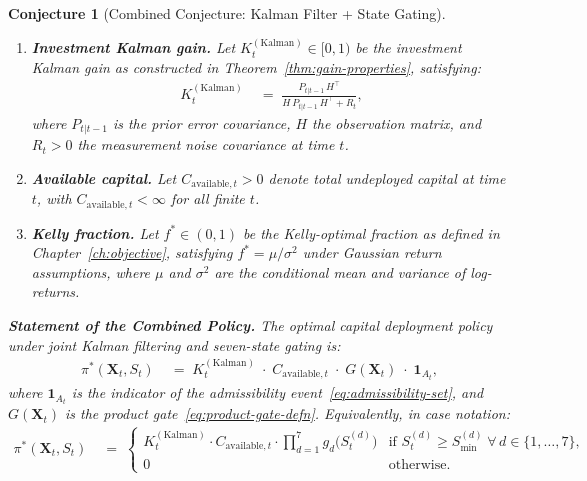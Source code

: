 \documentclass[12pt,openany]{book}
\numberwithin{equation}{chapter}
\theoremstyle{plain}
\newtheorem{conjecture}[theorem]{Conjecture}
\theoremstyle{definition}
\theoremstyle{remark}
\def\mathcal#1{#1}%
\begin{document}
\begin{conjecture}[Combined Conjecture: Kalman Filter + State Gating]
\begin{enumerate}
  \item \textbf{Investment Kalman gain.}
        Let $K_t^{(\mathrm{Kalman})} \in [0,1)$ be the
        investment Kalman gain as constructed in
        Theorem~\ref{thm:gain-properties}, satisfying:
        \begin{align}
          K_t^{(\mathrm{Kalman})}
          &\;=\;
          \frac{P_{t|t-1}\,H^\top}
               {H\,P_{t|t-1}\,H^\top + R_t},
          \label{eq:kalman-gain-recall}
        \end{align}
        where $P_{t|t-1}$ is the prior error covariance,
        $H$ the observation matrix, and $R_t > 0$ the
        measurement noise covariance at time $t$.

  \item \textbf{Available capital.}
        Let $C_{\mathrm{available},t} > 0$ denote total
        undeployed capital at time $t$, with
        $C_{\mathrm{available},t} < \infty$ for all finite $t$.

  \item \textbf{Kelly fraction.}
        Let $f^* \in (0,1)$ be the Kelly-optimal fraction
        as defined in Chapter~\ref{ch:objective}, satisfying
        $f^* = \mu / \sigma^2$ under Gaussian return
        assumptions, where $\mu$ and $\sigma^2$ are the
        conditional mean and variance of log-returns.
\end{enumerate}

\medskip
\noindent\textbf{Statement of the Combined Policy.}
The optimal capital deployment policy under joint
Kalman filtering and seven-state gating is:
\begin{align}
  \pi^*(\mathbf{X}_t, S_t)
  &\;=\;
  K_t^{(\mathrm{Kalman})}\;\cdot\; C_{\mathrm{available},t}
  \;\cdot\; G(\mathbf{X}_t)
  \;\cdot\; \mathbf{1}_{\mathcal{A}_t},
  \label{eq:combined-policy}
\end{align}
where $\mathbf{1}_{\mathcal{A}_t}$ is the indicator of the
admissibility event~\eqref{eq:admissibility-set}, and
$G(\mathbf{X}_t)$ is the product gate~\eqref{eq:product-gate-defn}.
Equivalently, in case notation:
\begin{align}
  \pi^*(\mathbf{X}_t, S_t)
  &\;=\;
  \begin{cases}
    K_t^{(\mathrm{Kalman})}
    \cdot C_{\mathrm{available},t}
    \cdot \displaystyle\prod_{d=1}^{7} g_d\!\bigl(\mathcal{S}_t^{(d)}\bigr)
    & \text{if } \mathcal{S}_t^{(d)} \geq \mathcal{S}_{\min}^{(d)}
      \;\forall\, d \in \{1,\ldots,7\}, \\[8pt]
    0
    & \text{otherwise}.
  \end{cases}
  \label{eq:combined-policy-cases}
\end{align}


\end{conjecture}
\end{document}
